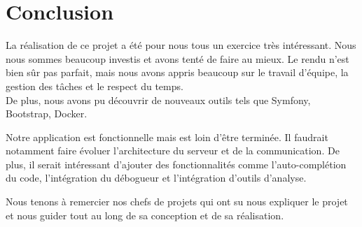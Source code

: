\chapter{Conclusion}

\par La réalisation de ce projet a été pour nous tous un exercice très intéressant. Nous nous sommes beaucoup investis et avons tenté de faire au mieux. Le rendu n'est bien sûr pas parfait, mais nous avons appris beaucoup sur le travail d'équipe, la gestion des tâches et le respect du temps.\\
De plus, nous avons pu découvrir de nouveaux outils tels que Symfony, Bootstrap, Docker. \\

\par Notre application est fonctionnelle mais est loin d'être terminée. Il faudrait notamment faire évoluer l'architecture du serveur et de la communication. De plus, il serait intéressant d'ajouter des fonctionnalités comme l'auto-complétion du code, l’intégration du débogueur et l'intégration d’outils d’analyse. \\

\par Nous tenons à remercier nos chefs de projets qui ont su nous expliquer le projet et nous guider tout au long de sa conception et de sa réalisation.